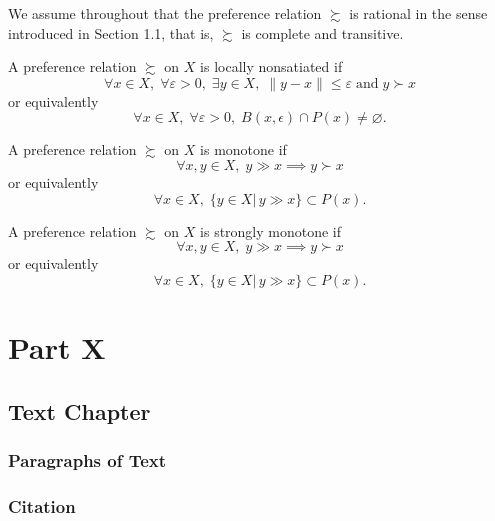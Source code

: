 \documentclass[11pt,fleqn]{book} %
\begin{document}
We assume throughout that the preference relation $\succsim$ is rational in the sense introduced in Section 1.1, that is, $\succsim$ is complete and transitive.

\begin{definition}
	A preference relation $\succsim$ on $X$ is locally nonsatiated if
	\[
	\forall x\in X,\;\forall \varepsilon>0,\;\exists y\in X,\;\|y-x\|\le\varepsilon\;\text{and}\;y\succ x
	\]
	or equivalently
	\[
	\forall x\in X,\;\forall \varepsilon>0,\;B(x,\epsilon)\cap P(x)\ne\varnothing.
	\]
\end{definition}

\begin{definition}[Monotonicity]
	A preference relation $\succsim$ on $X$ is monotone if
	\[
	\forall x,y\in X,\;y\gg x\implies y\succ x
	\]
	or equivalently
	\[
	\forall x\in X,\;\{y\in X|\,y\gg x\}\subset P(x).
	\]
\end{definition}

\begin{definition}
	A preference relation $\succsim$ on $X$ is strongly monotone if
	\[
	\forall x,y\in X,\;y\gg x\implies y\succ x
	\]
	or equivalently
	\[
	\forall x\in X,\;\{y\in X|\,y\gg x\}\subset P(x).
	\]
\end{definition}

\part{Part X}



\chapter{Text Chapter}

\section{Paragraphs of Text}

\lipsum[1-7] %


\section{Citation}
\end{document}
